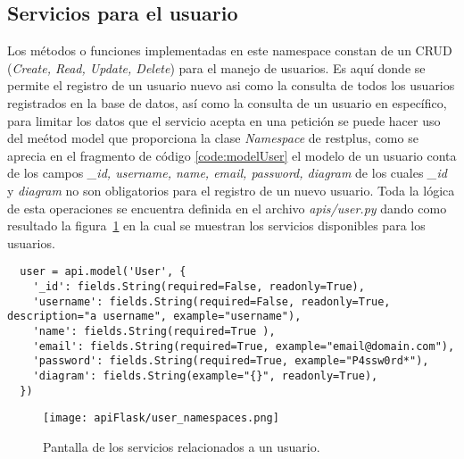 \subsection{Servicios para el usuario}

Los métodos o funciones implementadas en este namespace constan de un CRUD (\textit{Create, Read, Update, Delete}) para el manejo de usuarios. Es aquí donde se permite el registro de un usuario nuevo asi como la consulta de todos los usuarios registrados en la base de datos, así como la consulta de un usuario en específico, para limitar los datos que el servicio acepta en una petición se puede hacer uso del meétod model que proporciona la clase \textit{Namespace} de restplus, como se aprecia en el fragmento de código \ref{code:modelUser} el modelo de un usuario conta de los campos \textit{\_id, username, name, email, password, diagram} de los cuales \textit{\_id} y \textit{diagram} no son obligatorios para el registro de un nuevo usuario. Toda la lógica de esta operaciones se encuentra definida en el archivo \textit{apis/user.py} dando como resultado la figura~\ref{img:userEndpoints} en la cual se muestran los servicios disponibles para los usuarios.


\begin{code}
\label{code:apiInit}
\begin{verbatim}
  user = api.model('User', {
    '_id': fields.String(required=False, readonly=True),
    'username': fields.String(required=False, readonly=True, description="a username", example="username"),
    'name': fields.String(required=True ),
    'email': fields.String(required=True, example="email@domain.com"),
    'password': fields.String(required=True, example="P4ssw0rd*"),
    'diagram': fields.String(example="{}", readonly=True),
  })

\end{verbatim}
\end{code}

\begin{figure}[H]
  \centering
  \texttt{[image: apiFlask/user\_namespaces.png]}
  \caption{Pantalla de los servicios relacionados a un usuario.}
  \label{img:userEndpoints}
\end{figure}